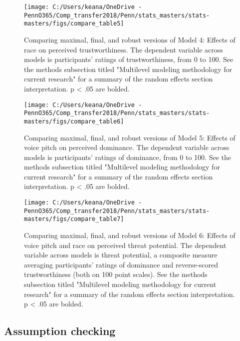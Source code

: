 \documentclass[
  english,
  man, noextraspace,floatsintext]{apa6}
\begin{document}
\begin{figure}

{\centering \texttt{[image: C:/Users/keana/OneDrive - PennO365/Comp\_transfer2018/Penn/stats\_masters/stats-masters/figs/compare\_table5]} 

}

\caption{Comparing maximal, final, and robust versions of Model 4: Effects of race on perceived trustworthiness. The dependent variable across models is participants' ratings of trustworthiness, from 0 to 100. See the methods subsection titled "Multilevel modeling methodology for current research" for a summary of the random effects section interpretation. p < .05 are bolded.}\label{fig:f14}
\end{figure}

\begin{figure}

{\centering \texttt{[image: C:/Users/keana/OneDrive - PennO365/Comp\_transfer2018/Penn/stats\_masters/stats-masters/figs/compare\_table6]} 

}

\caption{Comparing maximal, final, and robust versions of Model 5: Effects of voice pitch on perceived dominance. The dependent variable across models is participants' ratings of dominance, from 0 to 100. See the methods subsection titled "Multilevel modeling methodology for current research" for a summary of the random effects section interpretation. p < .05 are bolded.}\label{fig:f15}
\end{figure}

\begin{figure}

{\centering \texttt{[image: C:/Users/keana/OneDrive - PennO365/Comp\_transfer2018/Penn/stats\_masters/stats-masters/figs/compare\_table7]} 

}

\caption{Comparing maximal, final, and robust versions of Model 6: Effects of voice pitch and race on perceived threat potential. The dependent variable across models is threat potential, a composite measure averaging participants' ratings of dominance and reverse-scored trustworthiness (both on 100 point scales). See the methods subsection titled "Multilevel modeling methodology for current research" for a summary of the random effects section interpretation. p < .05 are bolded.}\label{fig:f16}
\end{figure}

\hypertarget{assumption-checking}{%
\subsection{Assumption checking}\label{assumption-checking}}
\end{document}
